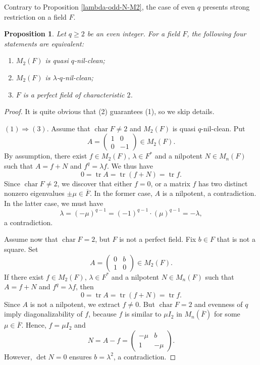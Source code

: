 \documentclass{amsart}
\DeclareMathOperator{\Char}{char}
\DeclareMathOperator{\tr}{tr}
\newtheorem{proposition}[theorem]{Proposition}
\theoremstyle{definition}
\theoremstyle{remark}
\numberwithin{equation}{section}
\begin{document}
Contrary to Proposition \ref{lambda-odd-N-M2}, the case of even $q$ presents strong restriction on a field $F$.

\begin{proposition}\label{lambda-even-N-M2}
Let $q \geq 2$ be an even integer. For a field $F$, the following four statements are equivalent:
\begin{enumerate}
\item $M_{2}(F)$ is quasi $q$-nil-clean;
\item $M_{2}(F)$ is $\lambda$-$q$-nil-clean;
\item $F$ is a perfect field of characteristic $2$.
\end{enumerate}
\end{proposition}

\begin{proof}
It is quite obvious that (2) guarantees (1), so we skip details.

\medskip

$(1) \Rightarrow (3)$. Assume that $\Char F \not= 2$ and $M_{2}(F)$ is quasi $q$-nil-clean. Put
\[
  A =
  \left(
  \begin{array}{cc}
    1 & 0
    \\
    0 & -1
  \end{array}
  \right) \in M_{2}(F).
\]
By assumption, there exist $f \in M_{2}(F)$, $\lambda \in F^{*}$ and a nilpotent $N \in M_{n}(F)$ such that
$A = f + N$ and $f^{q} = \lambda f$. We thus have
\[
  0 = \tr A = \tr (f + N) = \tr f.
\]
Since $\Char F \not= 2$, we discover that either $f = 0$, or a matrix $f$ has two distinct nonzero eigenvalues $\pm \mu \in \overline{F}$. In the former case, $A$ is a nilpotent, a contradiction. In the latter case, we must have $$\lambda = (-\mu)^{q-1} = (-1)^{q-1} \cdot (\mu)^{q-1} = -\lambda,$$ a contradiction.

\medskip

Assume now that $\Char F = 2$, but $F$ is not a perfect field. Fix $b \in F$ that is not a square.
Set
\[
  A  =
  \left(
  \begin{array}{cc}
    0 & b
    \\
    1 & 0
  \end{array}
  \right) \in M_{2}(F).
\]
If there exist $f \in M_{2}(F)$, $\lambda \in F^{*}$ and a nilpotent $N \in M_{n}(F)$ such that
$A = f + N$ and $f^{q}=\lambda f$, then
\[
  0 = \tr A = \tr(f + N) = \tr f.
\]
Since $A$ is not a nilpotent, we extract $f \not=0$. But $\Char F = 2$ and evenness of $q$ imply diagonalizability of $f$, because $f$ is similar to $\mu I_{2}$ in $M_{n}(\overline{F})$ for some $\mu \in \overline{F}$. Hence, $f = \mu I_{2}$ and
\[
  N = A - f =
  \left(
  \begin{array}{cc}
    -\mu & b
    \\
    1 & -\mu
  \end{array}
  \right).
\]
However, $\det N = 0$ ensures $b = \lambda^{2}$, a contradiction.


\end{proof}
\end{document}
